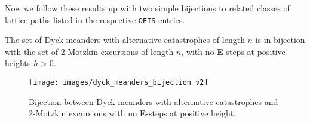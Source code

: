 Now we follow these results up with two simple bijections to related classes of lattice paths listed in the respective \href{https://oeis.org}{\texttt{OEIS}} entries.

\begin{theorem}
  The set of Dyck meanders with alternative catastrophes of length $n$ is in bijection with the set of 2-Motzkin excursions of length $n$, with no \textbf{E}-steps at positive heights $h > 0$.
\end{theorem}

\begin{figure}[hbt!]
  \centering
  \texttt{[image: images/dyck\_meanders\_bijection v2]}
  \caption[Bijection involving Dyck meanders with alternative catastrophes.]{Bijection between Dyck meanders with alternative catastrophes and 2-Motzkin excursions with no \textbf{E}-steps at positive height.}
  \label{fig:dyck_meanders_bijection}
\end{figure}


